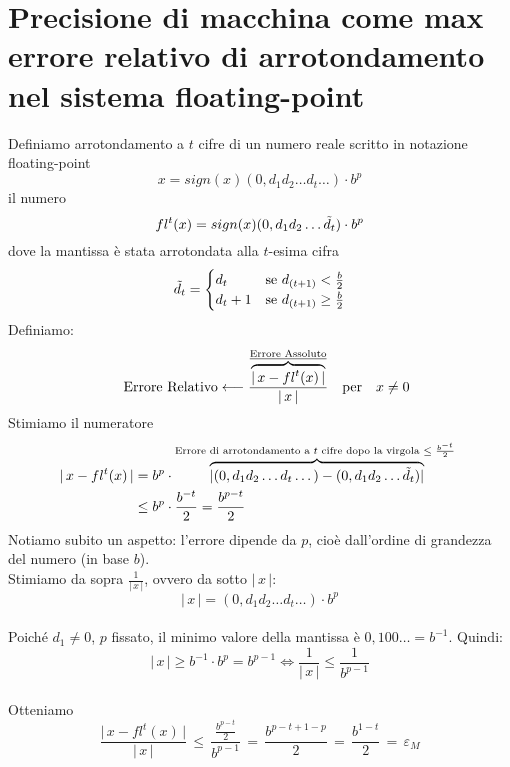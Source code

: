 \section{Precisione di macchina come max errore relativo di arrotondamento nel sistema floating-point}
Definiamo arrotondamento a $t$ cifre di un numero reale scritto in notazione floating-point \[ x = sign(x)(0,d_1 d_2 \dotsc d_t \dotsc) \cdot b^p \]
il numero \[ fl^t(x) = sign(x)(0,d_1 d_2 \dotsc \Tilde{d}_t) \cdot b^p \]
dove la mantissa è stata arrotondata alla $t$-esima cifra
\[\Tilde{d}_t = 
\begin{cases}
d_t & \text{se $d_{(t+1)} < \frac{b}{2}$} \\
d_t+1 & \text{se $d_{(t+1)} \ge \frac{b}{2}$}
\end{cases}
\]
Definiamo: \[ \quad \text{Errore Relativo} \longleftarrow \frac{\overbrace{\lvert \, x - fl^t(x) \, \rvert}^{\text {\underline{Errore Assoluto}}}}{\lvert \, x \, \rvert} \quad \text{per}\quad x \ne 0 \]
Stimiamo il numeratore
\[ \begin{split}
\lvert \, x - fl^t(x) \, \rvert & = b^p \cdot \overbrace{\lvert (0,d_1 d_2 \dotsc d_t \dotsc) - (0,d_1 d_2 \dotsc \Tilde{d}_t) \rvert}^{\text {Errore di arrotondamento a $t$ cifre dopo la virgola $ \le \frac{b^{-t}}{2}$ }} \\
& \le b^p \cdot \frac{b^{-t}}{2} = \frac{b^{p-t}}{2}
\end{split}\]
Notiamo subito un aspetto: l'errore dipende da $p$, cioè dall'ordine di grandezza del numero (in base $b$).\\
Stimiamo da sopra $ \frac{1}{\lvert \, x  \, \rvert} $, ovvero da sotto $\lvert \, x  \, \rvert$:
\[ \lvert \, x \, \rvert = (0,d_1 d_2 \dotsc d_t \dotsc ) \cdot b^p \] \\
Poiché $d_1 \ne 0$, $p$ fissato, il minimo valore della mantissa è $0,100 \dotsc = b^{-1}$. Quindi:
\[ \lvert \, x  \, \rvert \ge b^{-1} \cdot b^{p} = b^{p-1} \iff \frac{1}{\lvert \, x  \, \rvert} \le \frac{1}{b^{p-1}} \]\\
Otteniamo
\[ \frac{\lvert \, x - fl^t(x) \, \rvert}{\lvert \, x \, \rvert} \, \le \, \frac{\frac{b^{p-t}}{2}}{b^{p-1}} \,=\, \frac{b^{p-t+1-p}}{2} \,=\, \frac{b^{1-t}}{2} \,=\, \varepsilon_M\]